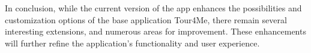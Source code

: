 In conclusion, while the current version of the app enhances the possibilities and customization options of the base application Tour4Me, there remain several interesting extensions, and numerous areas for improvement.
These enhancements will further refine the application's functionality and user experience.


